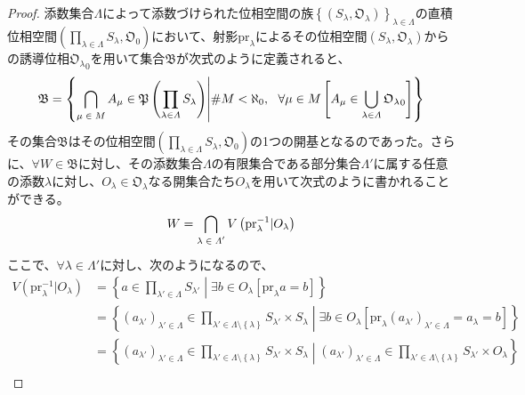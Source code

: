 \documentclass[dvipdfmx]{jsarticle}
\begin{document}
\begin{proof}
添数集合$\varLambda$によって添数づけられた位相空間の族$\left\{ \left( S_{\lambda},\mathfrak{O}_{\lambda} \right) \right\}_{\lambda \in \varLambda}$の直積位相空間$\left( \prod_{\lambda \in \varLambda} S_{\lambda},\mathfrak{O}_{0} \right)$において、射影${\mathrm{pr}}_{\lambda}$によるその位相空間$\left( S_{\lambda},\mathfrak{O}_{\lambda} \right)$からの誘導位相${\mathfrak{O}_{\lambda}}_{0}$を用いて集合$\mathfrak{B}$が次式のように定義されると、
\begin{align*}
\mathfrak{B} = \left\{ \bigcap_{\scriptsize \begin{matrix}
\mu \in M \\
\end{matrix}} A_{\mu}\in \mathfrak{P}\left( \prod_{\lambda \in \varLambda} S_{\lambda} \right) \middle| {\#}M < \aleph_{0},\ \ \forall\mu \in M\left[ A_{\mu} \in \bigcup_{\lambda \in \varLambda} {\mathfrak{O}_{\lambda}}_{0} \right] \right\}
\end{align*}
その集合$\mathfrak{B}$はその位相空間$\left( \prod_{\lambda \in \varLambda} S_{\lambda},\mathfrak{O}_{0} \right)$の1つの開基となるのであった。さらに、$\forall W \in \mathfrak{B}$に対し、その添数集合$\varLambda$の有限集合である部分集合$\varLambda'$に属する任意の添数$\lambda$に対し、$O_{\lambda} \in \mathfrak{O}_{\lambda}$なる開集合たち$O_{\lambda}$を用いて次式のように書かれることができる。
\begin{align*}
W = \bigcap_{\scriptsize \begin{matrix}
\lambda \in \varLambda' \\
\end{matrix}} {V\left( {\mathrm{pr}}_{\lambda}^{- 1}|O_{\lambda} \right)}
\end{align*}
ここで、$\forall\lambda \in \varLambda'$に対し、次のようになるので、
\begin{align*}
V\left( {\mathrm{pr}}_{\lambda}^{- 1}|O_{\lambda} \right) &= \left\{ a \in \prod_{\lambda' \in \varLambda} S_{\lambda'} \middle| \exists b \in O_{\lambda}\left[ {\mathrm{pr}}_{\lambda}a = b \right] \right\}\\
&= \left\{ \left( a_{\lambda'} \right)_{\lambda' \in \varLambda} \in \prod_{\lambda' \in \varLambda \setminus \left\{ \lambda \right\}} S_{\lambda'} \times S_{\lambda} \middle| \exists b \in O_{\lambda}\left[ {\mathrm{pr}}_{\lambda}\left( a_{\lambda'} \right)_{\lambda' \in \varLambda} = a_{\lambda} = b \right] \right\}\\
&= \left\{ \left( a_{\lambda'} \right)_{\lambda' \in \varLambda} \in \prod_{\lambda' \in \varLambda \setminus \left\{ \lambda \right\}} S_{\lambda'} \times S_{\lambda} \middle| \left( a_{\lambda'} \right)_{\lambda' \in \varLambda} \in \prod_{\lambda' \in \varLambda \setminus \left\{ \lambda \right\}} S_{\lambda'} \times O_{\lambda} \right\}\\

\end{align*}
\end{proof}
\end{document}
